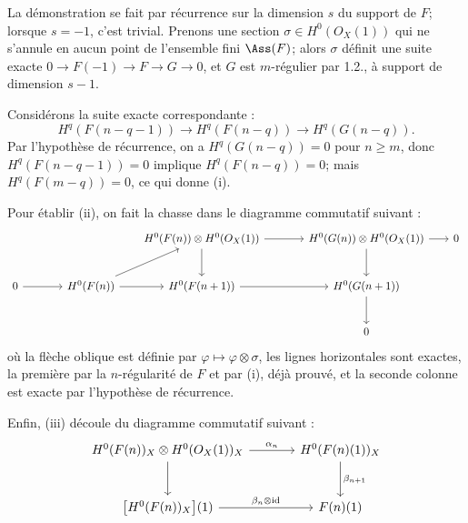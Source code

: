 
La
démonstration se fait par récurrence sur la dimension \(s\) du support de \(F\); lorsque \(s=-1\), c'est trivial. Prenons une section \(\sigma\in H^0({O}_X(1))\) qui ne s'annule en aucun point de l'ensemble fini \(\Ass(F)\); alors \(\sigma\) définit une suite exacte \(0\longrightarrow F(-1)\longrightarrow F\longrightarrow G\longrightarrow 0\), et \(G\) est \(m\)-régulier par 1.2., à support de dimension \(s-1\).

Considérons la suite exacte correspondante :
\[
H^q(F(n-q-1))\longrightarrow H^q(F(n-q))\longrightarrow H^q(G(n-q)).
\]
Par l'hypothèse de récurrence, on a \(H^q(G(n-q))=0\) pour \(n\ge m\), donc \(H^q(F(n-q-1))=0\) implique \(H^q(F(n-q))=0\); mais \(H^q(F(m-q))=0\), ce qui donne (i).

Pour établir (ii), on fait la chasse dans le diagramme commutatif suivant :
\[
\begin{tikzcd}[column sep=1.8em,row sep=2.5em]
 & & & H^0(F(n))\otimes H^0({O}_X(1)) \arrow[rr] \arrow[d]
 & & H^0(G(n))\otimes H^0({O}_X(1)) \arrow[r] \arrow[d]
 & 0 \\
0 \arrow[rr]
& & H^0(F(n)) \arrow[ur] \arrow[r]
& H^0(F(n+1)) \arrow[rr]
& & H^0(G(n+1)) \arrow[d] \\
& & & & & 0
\end{tikzcd}
\]
où la flèche oblique est définie par \(\varphi\mapsto\varphi\otimes\sigma\), les lignes horizontales sont exactes, la première par la \(n\)-régularité de \(F\) et par (i), déjà prouvé, et la seconde colonne est exacte par l'hypothèse de récurrence.

Enfin, (iii) découle du diagramme commutatif suivant :
\[
\begin{tikzcd}[column sep=large,row sep=large]
H^0(F(n))_X\otimes H^0({O}_X(1))_X
  \arrow[r,"\alpha_n"]
  \arrow[d]
& H^0(F(n)(1))_X
  \arrow[d,"\beta_{n+1}"] \\
\bigl[H^0(F(n))_X\bigr](1)
  \arrow[r,"\beta_n\otimes\mathrm{id}"]
& F(n)(1)
\end{tikzcd}
\]
